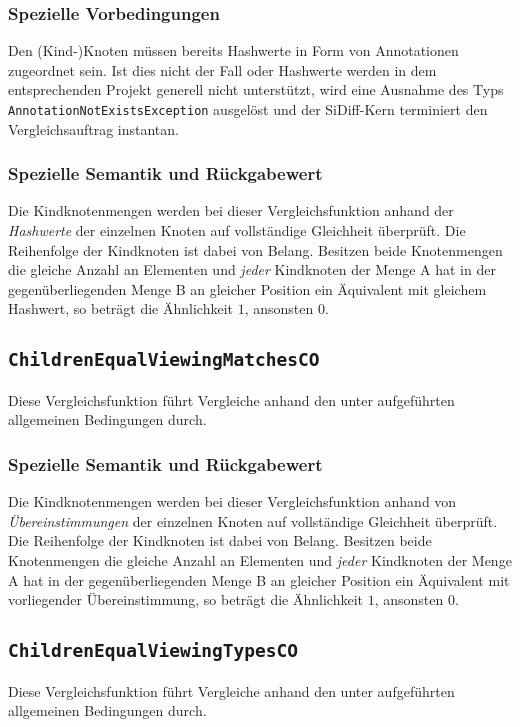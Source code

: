 \subsubsection*{Spezielle Vorbedingungen}
Den (Kind-)Knoten müssen bereits Hashwerte in Form von Annotationen zugeordnet sein. Ist dies nicht der Fall oder Hashwerte werden in dem entsprechenden Projekt generell nicht unterstützt, wird eine Ausnahme des Typs \texttt{AnnotationNotExistsException} ausgelöst und der SiDiff-Kern terminiert den Vergleichsauftrag instantan.

\subsubsection*{Spezielle Semantik und Rückgabewert}
Die Kindknotenmengen werden bei dieser Vergleichsfunktion anhand der \emph{Hashwerte} der einzelnen Knoten auf vollständige Gleichheit überprüft. Die Reihenfolge der Kindknoten ist dabei von Belang. Besitzen beide Knotenmengen die gleiche Anzahl an Elementen und \emph{jeder} Kindknoten der Menge A hat in der gegenüberliegenden Menge B an gleicher Position ein Äquivalent mit gleichem Hashwert, so beträgt die Ähnlichkeit $1$, ansonsten $0$.


%
%
\subsection{\texttt{ChildrenEqualViewingMatchesCO}}
Diese Vergleichsfunktion führt Vergleiche anhand den unter  aufgeführten allgemeinen Bedingungen durch.

\subsubsection*{Spezielle Semantik und Rückgabewert}
Die Kindknotenmengen werden bei dieser Vergleichsfunktion anhand von \emph{Übereinstimmungen} der einzelnen Knoten auf vollständige Gleichheit überprüft. Die Reihenfolge der Kindknoten ist dabei von Belang. Besitzen beide Knotenmengen die gleiche Anzahl an Elementen und \emph{jeder} Kindknoten der Menge A hat in der gegenüberliegenden Menge B an gleicher Position ein Äquivalent mit vorliegender Übereinstimmung, so beträgt die Ähnlichkeit $1$, ansonsten $0$.


%
%
\subsection{\texttt{ChildrenEqualViewingTypesCO}}
Diese Vergleichsfunktion führt Vergleiche anhand den unter  aufgeführten allgemeinen Bedingungen durch.

